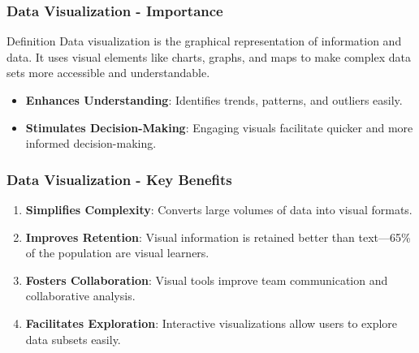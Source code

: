 \documentclass{beamer}
\begin{document}
\begin{frame}[fragile]
    \frametitle{Data Visualization - Importance}

    \begin{block}{Definition}
        Data visualization is the graphical representation of information and data. It uses visual elements like charts, graphs, and maps to make complex data sets more accessible and understandable.
    \end{block}
    
    \begin{itemize}
        \item \textbf{Enhances Understanding}: Identifies trends, patterns, and outliers easily.
        \item \textbf{Stimulates Decision-Making}: Engaging visuals facilitate quicker and more informed decision-making.
    \end{itemize}
\end{frame}

\begin{frame}[fragile]
    \frametitle{Data Visualization - Key Benefits}

    \begin{enumerate}
        \item \textbf{Simplifies Complexity}: Converts large volumes of data into visual formats.
        \item \textbf{Improves Retention}: Visual information is retained better than text—65\% of the population are visual learners.
        \item \textbf{Fosters Collaboration}: Visual tools improve team communication and collaborative analysis.
        \item \textbf{Facilitates Exploration}: Interactive visualizations allow users to explore data subsets easily.
    \end{enumerate}
\end{frame}
\end{document}
